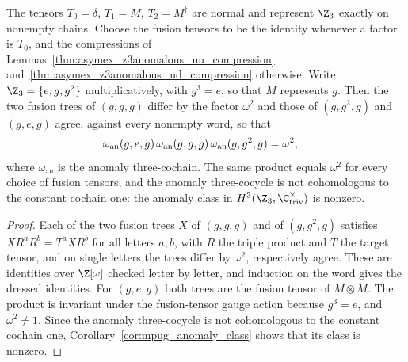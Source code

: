 \begin{lemma}
    \label{thm:asymex_z3anomalous_anomaly_class}
    \leanok
    The tensors $T_0=\delta$, $T_1=M$, $T_2=M^\dagger$ are normal and
    represent $\Z_3$ exactly on nonempty chains. Choose the fusion tensors
    to be the identity whenever a factor is $T_0$, and the compressions of
    Lemmas~\ref{thm:asymex_z3anomalous_uu_compression}
    and~\ref{thm:asymex_z3anomalous_ud_compression} otherwise. Write
    $\Z_3=\{e,g,g^2\}$ multiplicatively, with $g^3=e$, so that $M$
    represents $g$.
    Then the two fusion trees of $(g,g,g)$ differ by the factor $\omega^2$
    and those of $(g,g^2,g)$ and $(g,e,g)$ agree, against every nonempty
    word, so that
    \begin{align}
        \omega_{\mathrm{an}}(g,e,g)\,\omega_{\mathrm{an}}(g,g,g)\,
        \omega_{\mathrm{an}}(g,g^2,g)
         & =\omega^2,
        \notag
    \end{align}
    where $\omega_{\mathrm{an}}$ is the anomaly three-cochain. The same
    product equals $\omega^2$ for every choice of fusion tensors, and the
    anomaly three-cocycle is not cohomologous to the constant cochain one:
    the anomaly class in $H^3(\Z_3,\C^\times_{\mathrm{triv}})$ is nonzero.
\end{lemma}

\begin{proof}
    \leanok
    Each of the two fusion trees $X$ of $(g,g,g)$ and of $(g,g^2,g)$
    satisfies $XR^aR^b=T^aXR^b$ for all letters $a,b$, with $R$ the triple
    product and $T$ the target tensor, and on single letters the trees
    differ by $\omega^2$, respectively agree. These are identities over
    $\Z[\omega]$ checked letter by letter, and induction on the word gives
    the dressed identities. For $(g,e,g)$ both trees are the fusion tensor
    of $M\otimes M$. The product is invariant under the fusion-tensor gauge
    action because $g^3=e$, and $\omega^2\neq1$. Since the anomaly
    three-cocycle is not cohomologous to the constant cochain one,
    Corollary~\ref{cor:mpug_anomaly_class} shows that its class is nonzero.
\end{proof}


